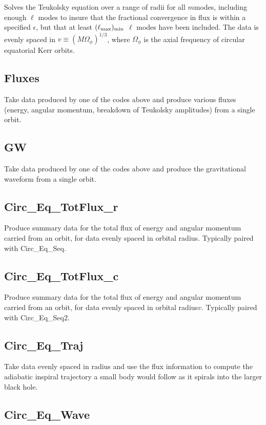 \documentclass[11pt]{article}
\begin{document}
Solves the Teukolsky equation over a range of radii for all $m$modes, including enough $\ell$ modes to insure that the fractional convergence in flux is within a specified $\epsilon$, but that at least $(\ell_{\rm max})_{\rm min}$ $\ell$ modes have been included.  The data is evenly spaced in $v \equiv (M\Omega_\phi)^{1/3}$, where $\Omega_\phi$ is the axial frequency of circular equatorial Kerr orbits.

\subsection{Fluxes}

Take data produced by one of the codes above and produce various fluxes (energy, angular momentum, breakdown of Teukolsky amplitudes) from a single orbit.

\subsection{GW}

Take data produced by one of the codes above and produce the gravitational waveform from a single orbit.

\subsection{Circ\_Eq\_TotFlux\_r}

Produce summary data for the total flux of energy and angular momentum carried from an orbit, for data evenly spaced in orbital radius.  Typically paired with Circ\_Eq\_Seq.

\subsection{Circ\_Eq\_TotFlux\_c}

Produce summary data for the total flux of energy and angular momentum carried from an orbit, for data evenly spaced in orbital radius$v$.  Typically paired with Circ\_Eq\_Seq2.

\subsection{Circ\_Eq\_Traj}

Take data evenly spaced in radius and use the flux information to compute the adiabatic inspiral trajectory a small body would follow as it spirals into the larger black hole.

\subsection{Circ\_Eq\_Wave}
\end{document}
